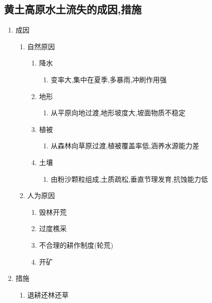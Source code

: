 \documentclass[a4paper]{article}
\begin{document}
    \subsection{黄土高原水土流失的成因,措施}
    \begin{enumerate}
        \item 成因
        \begin{enumerate}
            \item 自然原因
            \begin{enumerate} %
                \item 降水
                \begin{enumerate}
                    \item 变率大,集中在夏季,多暴雨,冲刷作用强
                \end{enumerate}
                \item 地形
                \begin{enumerate}
                    \item 从平原向地过渡,地形坡度大,坡面物质不稳定
                \end{enumerate}
                \item 植被
                \begin{enumerate}
                    \item 从森林向草原过渡,植被覆盖率低,涵养水源能力差
                \end{enumerate}
                \item 土壤
                \begin{enumerate}
                    \item 由粉沙颗粒组成,土质疏松,垂直节理发育,抗蚀能力低
                \end{enumerate}
            \end{enumerate}
            \item 人为原因
            \begin{enumerate}
                \item 毁林开荒
                \item 过度樵采
                \item 不合理的耕作制度(轮荒)
                \item 开矿
            \end{enumerate}
        \end{enumerate}
        \item 措施
        \begin{enumerate}
            \item 退耕还林还草

\end{enumerate}
\end{enumerate}
\end{document}
